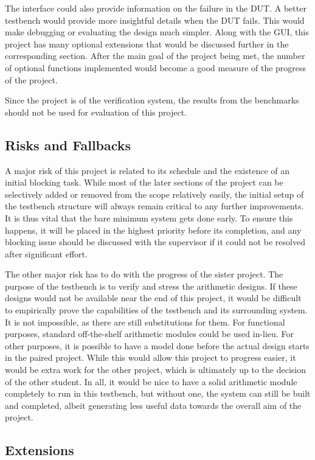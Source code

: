 The interface could also provide information on the failure in the DUT.
A better testbench would provide more insightful details when the DUT fails.
This would make debugging or evaluating the design much simpler.
Along with the GUI, this project has many optional extensions that would be
discussed further in the corresponding section.
After the main goal of the project being met, the number of optional functions
implemented would become a good measure of the progress of the project.

Since the project is of the verification system, the results from the benchmarks
should not be used for evaluation of this project.

\subsection{Risks and Fallbacks}
A major risk of this project is related to its schedule and the existence of an
initial blocking task.
While most of the later sections of the project can be selectively added or
removed from the scope relatively easily, the initial setup of the testbench
structure will always remain critical to any further improvements.
It is thus vital that the bare minimum system gets done early.
To ensure this happens, it will be placed in the highest priority before its
completion, and any blocking issue should be discussed with the supervisor if it
could not be resolved after significant effort.

The other major risk has to do with the progress of the sister project.
The purpose of the testbench is to verify and stress the arithmetic designs.
If these designs would not be available near the end of this project,
it would be difficult to empirically prove the capabilities of the testbench
and its surrounding system.
It is not impossible, as there are still substitutions for them.
For functional purposes, standard off-the-shelf arithmetic modules could be
used in-lieu.
For other purposes, it is possible to have a model done before the actual design
starts in the paired project.
While this would allow this project to progress easier, it would be extra work
for the other project, which is ultimately up to the decision of the other
student.
In all, it would be nice to have a solid arithmetic module completely to run
in this testbench, but without one, the system can still be built and completed,
albeit generating less useful data towards the overall aim of the project.

\subsection{Extensions}
